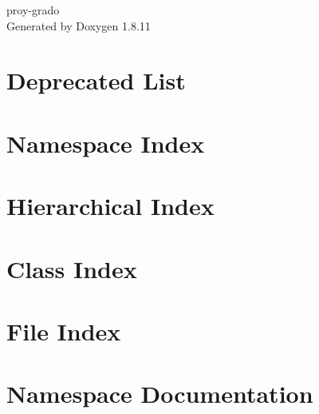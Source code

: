 \documentclass[twoside]{book}
\newcommand{\+}{\discretionary{\mbox{\scriptsize$\hookleftarrow$}}{}{}}
\newcommand{\clearemptydoublepage}{%
  \newpage{\pagestyle{empty}\cleardoublepage}%
}
\begin{document}
\hypersetup{pageanchor=false,
             bookmarksnumbered=true,
             pdfencoding=unicode
            }
\begin{titlepage}
\vspace*{7cm}
\begin{center}%
{\Large proy-\/grado }\\
\vspace*{1cm}
{\large Generated by Doxygen 1.8.11}\\
\end{center}
\end{titlepage}
\clearemptydoublepage
\tableofcontents
\clearemptydoublepage
{}
\hypersetup{pageanchor=true}

\chapter{Deprecated List}
\label{deprecated}
\hypertarget{deprecated}{}

\chapter{Namespace Index}

\chapter{Hierarchical Index}

\chapter{Class Index}

\chapter{File Index}

\chapter{Namespace Documentation}







\end{document}

